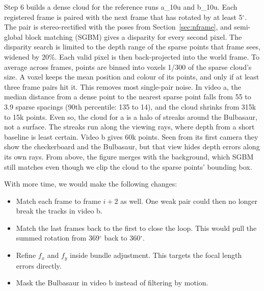 \documentclass[conference]{assets/latex/IEEEtran}
\begin{document}
Step 6 builds a dense cloud for the reference runs a\_10u and b\_10u. Each
registered frame is paired with the next frame that has rotated by at least
5$^\circ$. The pair is stereo-rectified with the poses from
Section~\ref{sec:nframe}, and semi-global block matching (SGBM) gives a
disparity for every second pixel. The disparity search is limited to the depth
range of the sparse points that frame sees, widened by 20\%. Each valid pixel is
then back-projected into the world frame. To average across frames, points are
binned into voxels 1/300 of the sparse cloud's size. A voxel keeps the mean
position and colour of its points, and only if at least three frame pairs hit
it. This removes most single-pair noise. In video a, the median distance from a
dense point to the nearest sparse point falls from 55 to 3.9 sparse spacings
(90th percentile: 135 to 14), and the cloud shrinks from 315k to 15k points.
Even so, the cloud for a is a halo of streaks around the Bulbasaur, not a
surface. The streaks run along the viewing rays, where depth from a short
baseline is least certain. Video b gives 60k points. Seen from its first camera
they show the checkerboard and the Bulbasaur, but that view hides depth errors
along its own rays. From above, the figure merges with the background, which
SGBM still matches even though we clip the cloud to the sparse points' bounding
box.

With more time, we would make the following changes:
\begin{itemize}
\item Match each frame to frame $i{+}2$ as well. One weak pair could then no
longer break the tracks in video b.
\item Match the last frames back to the first to close the loop. This would
pull the summed rotation from 369$^\circ$ back to 360$^\circ$.
\item Refine $f_x$ and $f_y$ inside bundle adjustment. This targets the focal
length errors directly.
\item Mask the Bulbasaur in video b instead of filtering by motion.
\end{itemize}

\printbibliography
\end{document}
